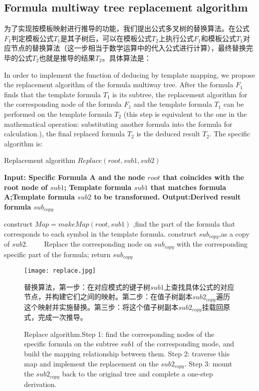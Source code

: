 \documentclass[runningheads]{llncs}
\begin{document}
\subsection{Formula multiway tree replacement algorithm}
为了实现按模板映射进行推导的功能，我们提出公式多叉树的替换算法。在公式$F_1$判定模板公式$T_1$是其子树后，可以在模板公式$T_2$上执行公式$F_1$和模板公式$T_1$对应节点的替换算法（这一步相当于数学运算中的代入公式进行计算），最终替换完毕的公式$T_2$也就是推导的结果$T_2$。具体算法是：

In order to implement the function of deducing by template mapping, we propose the replacement algorithm of the formula multiway tree. After the formula $F_1$ finds that the template formula $T_1$ is its subtree, the replacement algorithm for the corresponding node of the formula $F_1$ and the template formula $T_1$ can be performed on the template formula $T_2$ (this step is equivalent to the one in the mathematical operation: substituting another formula into the formula for calculation.), the final replaced formula $T_2$ is the deduced result $T_2$. The specific algorithm is:

\begin{algorithm}[t]
\caption{Replacement algorithm $Replace(root,sub1,sub2)$} %
\hspace*{0.02in} {\bf Input: Specific Formula A and the node $root$ that coincides with the root node of $sub1$; Template formula $sub1$ that matches formula A;Template formula $sub2$ to be transformed.} 
\hspace*{0.02in} {\bf Output:Derived result formula $sub_{copy}$} 
\begin{algorithmic}[1]
\State construct $Map = makeMap(root,sub1)$ ,find the part of the formula that corresponds to each symbol in the template formula.
\State construct $sub_{copy}$,as a copy of $sub2$.
　　\State Replace the corresponding node on $sub_{copy}$ with the corresponding specific part of the formula;
\EndFor
\State return $sub_{copy}$
\end{algorithmic}
\end{algorithm}

\begin{figure}[H]
\centering
\texttt{[image: replace.jpg]}
\caption{替换算法，第一步：在对应模式的键子树$sub1$上查找具体公式的对应节点，并构建它们之间的映射。第二步：在值子树副本$sub2_{copy}$遍历这个映射并实施替换。第三步：将这个值子树副本$sub2_{copy}$挂载回原式，完成一次推导。}
\caption{Replace algorithm.Step 1: find the corresponding nodes of the specific formula on the subtree $sub1$ of the corresponding mode, and build the mapping relationship between them. Step 2: traverse this map and implement the replacement on the $sub2_{copy}$. Step 3: mount the $sub2_{copy}$ back to the original tree and complete a one-step derivation.}
\end{figure}
\end{document}
